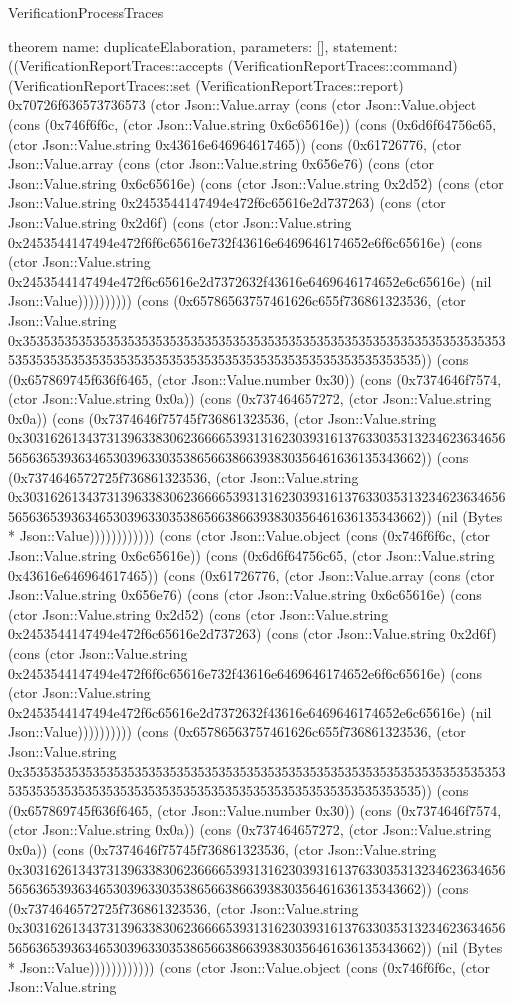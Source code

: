\begin{lexlean}{VerificationProcessTraces}
\begin{semanticmodule}
theorem{
  name: duplicateElaboration,
  parameters: [],
  statement: ((VerificationReportTraces::accepts (VerificationReportTraces::command) (VerificationReportTraces::set (VerificationReportTraces::report) 0x70726f636573736573 (ctor Json::Value.array (cons (ctor Json::Value.object (cons (0x746f6f6c, (ctor Json::Value.string 0x6c65616e)) (cons (0x6d6f64756c65, (ctor Json::Value.string 0x43616e646964617465)) (cons (0x61726776, (ctor Json::Value.array (cons (ctor Json::Value.string 0x656e76) (cons (ctor Json::Value.string 0x6c65616e) (cons (ctor Json::Value.string 0x2d52) (cons (ctor Json::Value.string 0x2453544147494e472f6c65616e2d737263) (cons (ctor Json::Value.string 0x2d6f) (cons (ctor Json::Value.string 0x2453544147494e472f6f6c65616e732f43616e6469646174652e6f6c65616e) (cons (ctor Json::Value.string 0x2453544147494e472f6c65616e2d7372632f43616e6469646174652e6c65616e) (nil Json::Value)))))))))) (cons (0x65786563757461626c655f736861323536, (ctor Json::Value.string 0x35353535353535353535353535353535353535353535353535353535353535353535353535353535353535353535353535353535353535353535353535353535)) (cons (0x657869745f636f6465, (ctor Json::Value.number 0x30)) (cons (0x7374646f7574, (ctor Json::Value.string 0x0a)) (cons (0x737464657272, (ctor Json::Value.string 0x0a)) (cons (0x7374646f75745f736861323536, (ctor Json::Value.string 0x30316261343731396338306236666539313162303931613763303531323462363465656563653936346530396330353865663866393830356461636135343662)) (cons (0x7374646572725f736861323536, (ctor Json::Value.string 0x30316261343731396338306236666539313162303931613763303531323462363465656563653936346530396330353865663866393830356461636135343662)) (nil (Bytes * Json::Value)))))))))))) (cons (ctor Json::Value.object (cons (0x746f6f6c, (ctor Json::Value.string 0x6c65616e)) (cons (0x6d6f64756c65, (ctor Json::Value.string 0x43616e646964617465)) (cons (0x61726776, (ctor Json::Value.array (cons (ctor Json::Value.string 0x656e76) (cons (ctor Json::Value.string 0x6c65616e) (cons (ctor Json::Value.string 0x2d52) (cons (ctor Json::Value.string 0x2453544147494e472f6c65616e2d737263) (cons (ctor Json::Value.string 0x2d6f) (cons (ctor Json::Value.string 0x2453544147494e472f6f6c65616e732f43616e6469646174652e6f6c65616e) (cons (ctor Json::Value.string 0x2453544147494e472f6c65616e2d7372632f43616e6469646174652e6c65616e) (nil Json::Value)))))))))) (cons (0x65786563757461626c655f736861323536, (ctor Json::Value.string 0x35353535353535353535353535353535353535353535353535353535353535353535353535353535353535353535353535353535353535353535353535353535)) (cons (0x657869745f636f6465, (ctor Json::Value.number 0x30)) (cons (0x7374646f7574, (ctor Json::Value.string 0x0a)) (cons (0x737464657272, (ctor Json::Value.string 0x0a)) (cons (0x7374646f75745f736861323536, (ctor Json::Value.string 0x30316261343731396338306236666539313162303931613763303531323462363465656563653936346530396330353865663866393830356461636135343662)) (cons (0x7374646572725f736861323536, (ctor Json::Value.string 0x30316261343731396338306236666539313162303931613763303531323462363465656563653936346530396330353865663866393830356461636135343662)) (nil (Bytes * Json::Value)))))))))))) (cons (ctor Json::Value.object (cons (0x746f6f6c, (ctor Json::Value.string }
\end{semanticmodule}
\end{lexlean}
